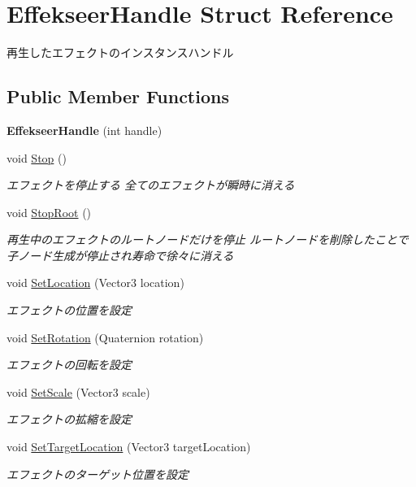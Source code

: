 \hypertarget{struct_effekseer_handle}{\section{Effekseer\-Handle Struct Reference}
\label{struct_effekseer_handle}
}


再生したエフェクトのインスタンスハンドル  


\subsection*{Public Member Functions}
\begin{DoxyCompactItemize}
\item 
\hypertarget{struct_effekseer_handle_a396167b208bb830dd0fcd65d677d0ab9}{{\bfseries Effekseer\-Handle} (int handle)}\label{struct_effekseer_handle_a396167b208bb830dd0fcd65d677d0ab9}

\item 
void \hyperlink{struct_effekseer_handle_add31723e9d75fad60015c48dfe1bf785}{Stop} ()
\begin{DoxyCompactList}\small\item\em エフェクトを停止する 全てのエフェクトが瞬時に消える \end{DoxyCompactList}\item 
void \hyperlink{struct_effekseer_handle_ae16184a6f1770d63edf941941b8ad063}{Stop\-Root} ()
\begin{DoxyCompactList}\small\item\em 再生中のエフェクトのルートノードだけを停止 ルートノードを削除したことで子ノード生成が停止され寿命で徐々に消える \end{DoxyCompactList}\item 
void \hyperlink{struct_effekseer_handle_a65d631a161e475acac133b6db28d0070}{Set\-Location} (Vector3 location)
\begin{DoxyCompactList}\small\item\em エフェクトの位置を設定 \end{DoxyCompactList}\item 
void \hyperlink{struct_effekseer_handle_a54be425dc9d059e66fe00799f34e25cf}{Set\-Rotation} (Quaternion rotation)
\begin{DoxyCompactList}\small\item\em エフェクトの回転を設定 \end{DoxyCompactList}\item 
void \hyperlink{struct_effekseer_handle_a858d40ff7676ec5c2ae062596f52795b}{Set\-Scale} (Vector3 scale)
\begin{DoxyCompactList}\small\item\em エフェクトの拡縮を設定 \end{DoxyCompactList}\item 
void \hyperlink{struct_effekseer_handle_aa13ed72d63bdcf16ab9683261b92c855}{Set\-Target\-Location} (Vector3 target\-Location)
\begin{DoxyCompactList}\small\item\em エフェクトのターゲット位置を設定 \end{DoxyCompactList}\end{DoxyCompactItemize}
